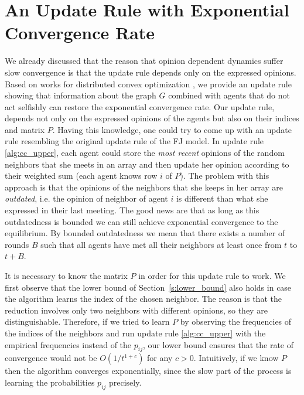 \section{An Update Rule with Exponential Convergence Rate}\label{s:cc_convergence}

We already discussed that the reason that opinion dependent dynamics suffer slow
convergence is that the update rule depends only on the expressed opinions.
Based on works for distributed convex optimization \cite{BT97},
we provide an update rule showing that information about the
graph $G$ combined with agents that do not act selfishly can restore the
exponential convergence rate.
Our update rule, depends not only on the expressed opinions of the
agents but also on their indices and matrix $P$.
Having this knowledge, one could try to come up with an
update rule resembling the original update rule of the FJ model.
In update rule \ref{alg:cc_upper}, each agent could store the
\emph{most recent} opinions of the random neighbors that she meets in an array
and then update her
opinion according to their weighted sum (each agent knows row $i$ of $P$).
The problem with this approach is that the opinions of the neighbors
that she keeps in her array are \emph{outdated}, i.e. the opinion of
neighbor of agent $i$ is different than what she expressed in their
last meeting.  The good news are that as long as this outdatedness
is bounded we can still achieve exponential convergence to the
equilibrium.  By bounded outdatedness we mean that there exists a
number of rounds $B$ such that all agents have met all their neighbors
at least once from $t$ to $t+B$.
\begin{remark}
It is necessary to know the matrix $P$ in order for this
update rule to work. We first observe that the lower bound of
Section~\ref{s:lower_bound} also holds in case the algorithm learns the index
of the chosen neighbor. The reason is that the reduction involves only two neighbors
with different opinions, so they are distinguishable.
Therefore, if we tried to learn $P$ by observing the frequencies
of the indices of the neighbors and run update rule \ref{alg:cc_upper}
with the empirical frequencies instead of the $p_{ij}$, our lower bound
ensures that the rate of convergence would not be $O(1/t^{1+c})$ for any $c>0$.
Intuitively, if we know $P$ then the algorithm converges exponentially,
since the slow part of the process is learning the probabilities $p_{ij}$
precisely.
\end{remark}
\vspace{-5mm}

